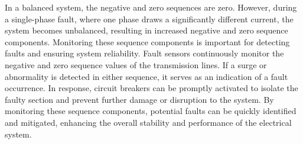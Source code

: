         In a balanced system, the negative and zero sequences are zero. However, during a single-phase fault, where one phase draws a significantly different current, the system becomes unbalanced, resulting in increased negative and zero sequence components. Monitoring these sequence components is important for detecting faults and ensuring system reliability. Fault sensors continuously monitor the negative and zero sequence values of the transmission lines. If a surge or abnormality is detected in either sequence, it serves as an indication of a fault occurrence. In response, circuit breakers can be promptly activated to isolate the faulty section and prevent further damage or disruption to the system. By monitoring these sequence components, potential faults can be quickly identified and mitigated, enhancing the overall stability and performance of the electrical system.